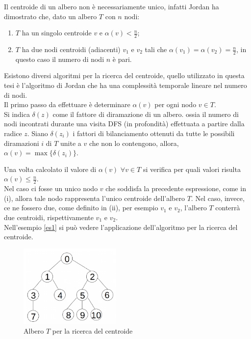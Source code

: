 Il centroide di un albero non \`e necessariamente unico, infatti Jordan \cite{jordan1869assemblages}  ha dimostrato che, dato un albero $ T $ con $ n $ nodi:
\begin{enumerate}
	\renewcommand{\labelenumi}{\roman{enumi}}
	\item $ T $ ha un singolo centroide $ v $ e $\alpha(v) < \frac{n}{2}$;
	\item$ T $ ha due nodi centroidi (adiacenti) $v_1$ e $v_2$ tali che $\alpha(v_1) = \alpha(v_2) = \frac{n}{2}$, in questo caso il numero di nodi $ n $ \`e pari.
\end{enumerate}

Esistono diversi algoritmi per la ricerca del centroide, quello utilizzato in questa tesi \`e l'algoritmo di Jordan \cite{jordan1869assemblages} che  ha una complessit\`a temporale lineare nel numero di nodi. \\
Il primo passo da effettuare \`e determinare $\alpha(v)$ per ogni nodo $ v \in T$.\\
Si indica  $\delta(z)$ come il fattore di diramazione di un albero. ossia il numero di nodi incontrati durante una visita DFS (in profondit\`a) effettuata a partire dalla radice $ z $.
Siano $\delta(z_i)$ i fattori di bilanciamento ottenuti da tutte le possibili diramazioni $ i $ di $ T $ unite a $ v $ che non lo contengono, allora, $ \alpha(v) = \max \{\delta(z_i)\} $.

Una volta calcolato il valore di $ \alpha(v) $ $ \forall v \in T $ si verifica per quali valori  risulta $\alpha(v)\le\frac{n}{2}$.\\
Nel caso ci fosse un unico nodo $ v $ che soddisfa la precedente espressione, come in (i),  allora tale nodo rappresenta l'unico  centroide dell'albero $ T $.
Nel caso, invece, ce ne fossero due, come definito in (ii), per esempio $ v_1 $ e $ v_2 $,  l'albero $ T $ conterr\`a due centroidi, rispettivamente $ v_1 $ e $ v_2 $.\\
Nell'esempio \ref{es1} si pu\`o vedere l'applicazione dell'algoritmo per la ricerca del centroide.
	\begin{figure}[htbp]
		\centering
		\includegraphics[width=5cm]{capitolo3/grafo2}
		\caption{Albero $ T $  per la ricerca del centroide} 
		\label{fig:2}
\end{figure}
\mbox{}\\

